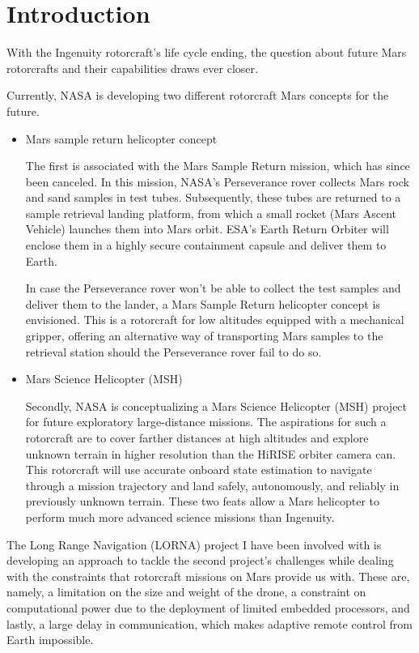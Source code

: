 \chapter{Introduction}
\label{sec:introduction}

With the Ingenuity rotorcraft's life cycle ending, the question about future Mars rotorcrafts and their capabilities draws ever closer.

Currently, NASA is developing two different rotorcraft Mars concepts for the future. 

\begin{itemize}
    \item Mars sample return helicopter concept

    The first is associated with the Mars Sample Return mission, which has since been canceled. In this mission, NASA's Perseverance rover collects Mars rock and sand samples in test tubes. Subsequently, these tubes are returned to a sample retrieval landing platform, from which a small rocket (Mars Ascent Vehicle) launches them into Mars orbit. ESA's Earth Return Orbiter will enclose them in a highly secure containment capsule and deliver them to Earth.
    
    In case the Perseverance rover won't be able to collect the test samples and deliver them to the lander, a Mars Sample Return helicopter concept is envisioned. This is a rotorcraft for low altitudes equipped with a mechanical gripper, offering an alternative way of transporting Mars samples to the retrieval station should the Perseverance rover fail to do so.

    \item Mars Science Helicopter (MSH)

    Secondly, NASA is conceptualizing a Mars Science Helicopter (MSH) project for future exploratory large-distance missions. The aspirations for such a rotorcraft are to cover farther distances at high altitudes and explore unknown terrain in higher resolution than the HiRISE orbiter camera can. This rotorcraft will use accurate onboard state estimation to navigate through a mission trajectory and land safely, autonomously, and reliably in previously unknown terrain. These two feats allow a Mars helicopter to perform much more advanced science missions than Ingenuity. 
\end{itemize}

The Long Range Navigation (LORNA) project I have been involved with is developing an approach to tackle the second project's challenges while dealing with the constraints that rotorcraft missions on Mars provide us with. These are, namely, a limitation on the size and weight of the drone, a constraint on computational power due to the deployment of limited embedded processors, and lastly, a large delay in communication, which makes adaptive remote control from Earth impossible.

